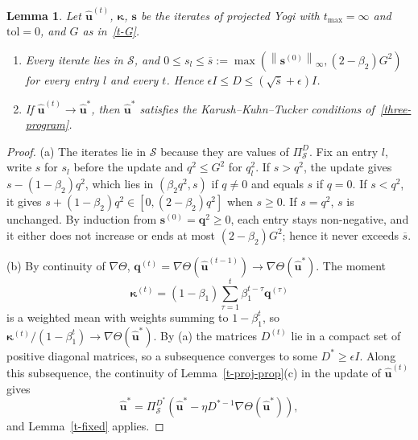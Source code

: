 \documentclass[11pt]{article}
\theoremstyle{plain}
\newtheorem{lemma}[theorem]{Lemma}
\theoremstyle{definition}
\theoremstyle{remark}
\renewcommand{\labelenumi}{\textbf{\arabic{enumi}.}}
\numberwithin{equation}{section}
\numberwithin{figure}{section}
\numberwithin{table}{section}
\begin{document}
\begin{lemma}\label{t-yogi-limit}
Let $\widehat{\bm u}^{(t)}$, $\bm\kappa$, $\bm s$ be the iterates of
projected Yogi with $t_{\max}=\infty$ and $\mathrm{tol}=0$, and
$G$ as in~\eqref{t-G}.
\begin{enumerate}
\renewcommand{\labelenumi}{(\alph{enumi})}
\item Every iterate lies in $\mathcal{S}$, and
$0\le s_l\le\overline{s}:=\max\left(\left\|\bm s^{(0)}\right\|_\infty,(2-\beta_2)G^2\right)$
for every entry $l$ and every $t$. Hence
$\epsilon I\le D\le\left(\sqrt{\overline{s}}+\epsilon\right)I$.
\item If $\widehat{\bm u}^{(t)}\to\widehat{\bm u}^*$, then
$\widehat{\bm u}^*$ satisfies the Karush--Kuhn--Tucker conditions
of~\eqref{three-program}.
\end{enumerate}
\end{lemma}
\begin{proof}
(a) The iterates lie in $\mathcal{S}$ because they are values of
$\Pi^D_{\mathcal{S}}$. Fix an entry $l$, write $s$ for $s_l$ before the update
and $q^2\le G^2$ for $q_l^2$. If $s>q^2$, the update gives
$s-(1-\beta_2)q^2$, which lies in $\left(\beta_2q^2,s\right)$ if $q\ne 0$ and
equals $s$ if $q=0$. If $s<q^2$, it gives $s+(1-\beta_2)q^2\in\left[0,(2-\beta_2)q^2\right]$
when $s\ge 0$. If $s=q^2$, $s$ is unchanged. By induction from
$\bm s^{(0)}=\bm q^2\ge 0$, each entry stays non-negative, and it either does
not increase or ends at most $(2-\beta_2)G^2$; hence it never exceeds $\overline{s}$.

(b) By continuity of $\nabla\Theta$,
$\bm q^{(t)}=\nabla\Theta\left(\widehat{\bm u}^{(t-1)}\right)\to\nabla\Theta\left(\widehat{\bm u}^*\right)$.
The moment
\begin{equation*}
\bm\kappa^{(t)}=(1-\beta_1)\sum_{\tau=1}^t\beta_1^{t-\tau}\bm q^{(\tau)}
\end{equation*}
is a weighted mean with weights summing to $1-\beta_1^t$, so
$\bm\kappa^{(t)}/\left(1-\beta_1^t\right)\to\nabla\Theta\left(\widehat{\bm u}^*\right)$.
By (a) the matrices $D^{(t)}$ lie in a compact set of positive diagonal
matrices, so a subsequence converges to some $D^*\ge\epsilon I$. Along this
subsequence, the continuity of Lemma~\ref{t-proj-prop}(c) in the update
of $\widehat{\bm u}^{(t)}$ gives
\begin{equation*}
\widehat{\bm u}^*=\Pi^{D^*}_{\mathcal{S}}\left(\widehat{\bm u}^*-\eta D^{*-1}\nabla\Theta\left(\widehat{\bm u}^*\right)\right),
\end{equation*}
and Lemma~\ref{t-fixed} applies.
\end{proof}
\end{document}
